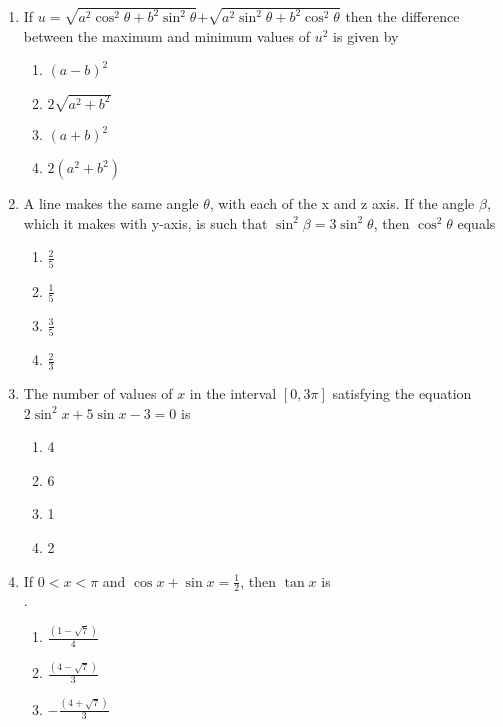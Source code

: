 \documentclass[journal,12pt,twocolumn]{IEEEtran}
\theoremstyle{remark}
\begin{document}
\begin{enumerate}
\item If $u=\sqrt{a^2 \cos^2 \theta+b^2 \sin^2 \theta}$$+$$\sqrt{a^2 \sin^2 \theta+b^2 \cos^2 \theta}$
then the difference between the  maximum and minimum values of $u^2$ is given by \hfill{}
\begin{multicols}{2} 
\begin{enumerate}
\item $(a-b)^2$
\item $2\sqrt{a^2 +b^2}$
\columnbreak
\item $(a+b)^2$
\item $2(a^2 +b^2)$
\end{enumerate} \end{multicols}
\item A line makes the same angle $\theta$, with each of the x and z axis. 
If the angle $\beta$, which it makes with y-axis, is such that
$\sin^2 \beta=3\sin^2 \theta$, then $\cos^2 \theta$ equals \hfill{}
\begin{multicols}{2} 
\begin{enumerate}
\item $\frac{2}{5}$
\item $\frac{1}{5}$
\columnbreak
\item $\frac{3}{5}$
\item $\frac{2}{3}$
\end{enumerate} 
\end{multicols}
\item The number of values of $x$ in the interval $[0,3\pi]$ satisfying the equation 
\\$2\sin^2 x+5\sin x-3=0$ is \hfill{}
\begin{multicols}{4}
\begin{enumerate}
\item 4
\columnbreak
\item 6
\columnbreak
\item 1
\columnbreak
\item 2
\end{enumerate} 
\end{multicols}
\item If $0<x<\pi$ and $\cos x+\sin x=\frac{1}{2}$, then $\tan x$ is 
\\.\hfill{}
\begin{multicols}{2} 
\begin{enumerate}
\item $\frac{(1-\sqrt{7})}{4}$
\item $\frac{(4-\sqrt{7})}{3}$
\columnbreak
\item $-\frac{(4+\sqrt{7})}{3}$

\end{enumerate}
\end{multicols}
\end{enumerate}
\end{document}
